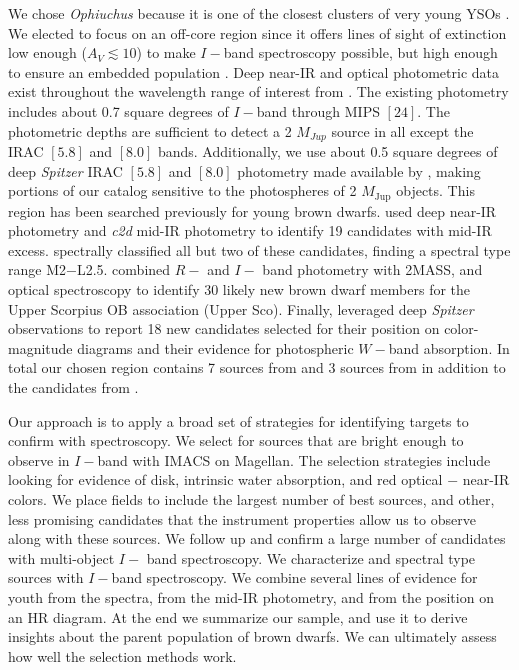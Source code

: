 We chose \emph{Ophiuchus} because it is one of the closest clusters of very young YSOs \citep{2008ApJ...675L..29L}.  We elected to focus on an off-core region since it offers lines of sight of extinction low enough ($A_V\lesssim 10$) to make $I-$band spectroscopy possible, but high enough to ensure an embedded population \citep{2008A&A...489..143L}.  Deep near-IR and optical photometric data exist throughout the wavelength range of interest from \citet{allers06}.  The existing \citet{allers06} photometry includes about 0.7 square degrees of $I-$band through MIPS $[24]$.  The photometric depths are sufficient to detect a 2 $M_{Jup}$ source in all except the IRAC $[5.8]$ and $[8.0]$ bands.  Additionally, we use about 0.5 square degrees of deep \emph{Spitzer} IRAC $[5.8]$ and $[8.0]$ photometry made available by \citet{2010ApJ...720.1374H}, making portions of our catalog sensitive to the photospheres of 2 $M_{\mathrm{Jup}}$ objects.  
This region has been searched previously for young brown dwarfs.  \citet{allers06} used deep near-IR photometry and \emph{c2d} mid-IR photometry to identify 19 candidates with mid-IR excess.  \citet{2011ASPC..448..633G} spectrally classified all but two of these candidates, finding a spectral type range M2$-$L2.5.  \citet{2006AJ....131.3016S} combined $R-$ and $I-$ band photometry with 2MASS, and optical spectroscopy to identify 30 likely new brown dwarf members for the Upper Scorpius OB association (Upper Sco).  Finally, \citet{2010ApJ...720.1374H} leveraged deep \emph{Spitzer} observations to report 18 new candidates selected for their position on color-magnitude diagrams and their evidence for photospheric $W-$band absorption.  In total our chosen region contains 7 sources from \citet{allers06} and 3 sources from \citet{2006AJ....131.3016S} in addition to the candidates from \citet{2010ApJ...720.1374H}.  

Our approach is to apply a broad set of strategies for identifying targets to confirm with spectroscopy.  We select for sources that are bright enough to observe in $I-$band with IMACS on Magellan.  The selection strategies include looking for evidence of disk, intrinsic water absorption, and red optical $-$ near-IR colors.    We place fields to include the largest number of best sources, and other, less promising candidates that the instrument properties allow us to observe along with these sources.  We follow up and confirm a large number of candidates with multi-object $I-$ band spectroscopy.  We characterize and spectral type sources with $I-$band spectroscopy.  We combine several lines of evidence for youth from the spectra, from the mid-IR photometry, and from the position on an HR diagram.  At the end we summarize our sample, and use it to derive insights about the parent population of brown dwarfs.  We can ultimately assess how well the selection methods work.

